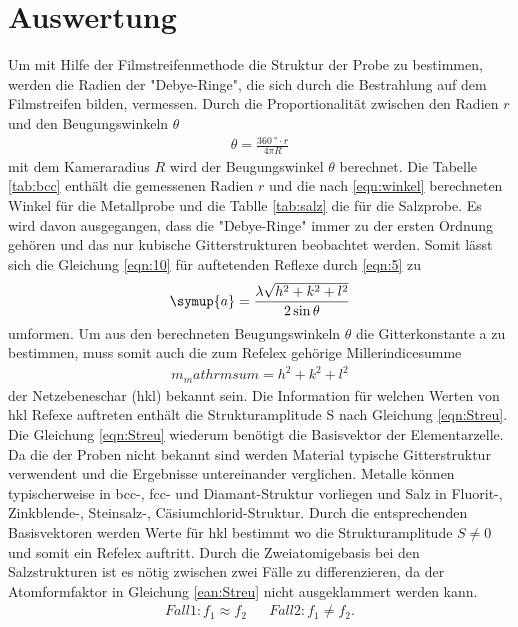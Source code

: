\section{Auswertung}
\label{sec:Auswertung}

Um mit Hilfe der Filmstreifenmethode die Struktur der Probe zu bestimmen, werden
die Radien der "Debye-Ringe", die sich durch die Bestrahlung auf dem Filmstreifen bilden,
vermessen. Durch die Proportionalität zwischen den Radien $r$ und den Beugungswinkeln $\theta$
\begin{align}
\theta=\frac{\SI{360}{\degree}\cdot r}{4 \pi R } \label{eqn:winkel}
\end{align}
mit dem Kameraradius $R$ wird der Beugungswinkel $\theta$ berechnet.
Die Tabelle \ref{tab:bcc} enthält die gemessenen Radien $r$ und die nach \ref{eqn:winkel} berechneten Winkel
für die Metallprobe und die Tablle \ref{tab:salz} die für die Salzprobe.
Es wird davon ausgegangen, dass die "Debye-Ringe" immer zu der ersten Ordnung gehören
und das nur kubische Gitterstrukturen beobachtet werden.
Somit lässt sich die Gleichung \ref{eqn:10} für auftetenden
Reflexe durch \eqref{eqn:5} zu
\begin{align}
\symup{a} = \frac{\lambda \sqrt{h^2 +k^2+l^2}}{2\sin{\theta}} \label{eqn:Gitterkonst}
\end{align}
umformen.
Um aus den berechneten Beugungswinkeln $\theta$ die Gitterkonstante a
zu bestimmen, muss somit auch die zum Refelex gehörige Millerindicesumme
\begin{align*}
  m_mathrm{sum}=h^{2} + k^{2} + l^{2}
\end{align*}
der Netzebeneschar (hkl) bekannt sein.
Die Information für welchen Werten von hkl Refexe auftreten
enthält die Strukturamplitude S nach Gleichung \eqref{eqn:Streu}.
Die Gleichung \eqref{eqn:Streu} wiederum benötigt die Basisvektor
der Elementarzelle. Da die der Proben nicht bekannt sind werden
Material typische Gitterstruktur verwendent und die Ergebnisse
untereinander verglichen. Metalle können typischerweise in
 bcc-, fcc- und Diamant-Struktur
vorliegen und Salz in Fluorit-, Zinkblende-,
Steinsalz-, Cäsiumchlorid-Struktur.
Durch die entsprechenden Basisvektoren
werden Werte für hkl bestimmt wo die Strukturamplitude
$S\neq0$ und somit ein Refelex auftritt.
Durch die Zweiatomigebasis bei den
Salzstrukturen ist es nötig zwischen zwei Fälle zu differenzieren,
da der Atomformfaktor in Gleichung
\eqref{ean:Streu} nicht ausgeklammert werden kann.
\begin{align*}
  Fall 1: f_1\approx f_2  & & Fall 2: f_1\neq f_2.
\end{align*}
